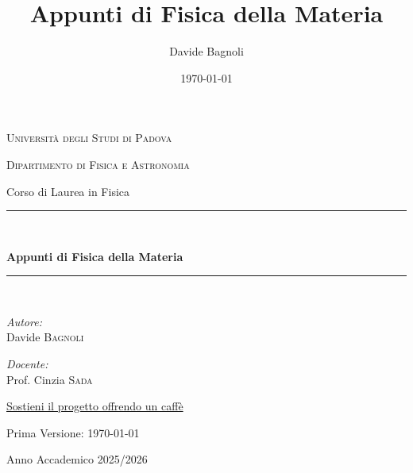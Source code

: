 \documentclass[12pt,a4paper,parskip=half,DIV=14,oneside,chapterprefix=true]{scrreprt}
\title{Appunti di Fisica della Materia}
\author{Davide Bagnoli}
\date{\today}
\begin{document}

\begin{titlepage}
    \centering
    {\scshape\LARGE Università degli Studi di Padova \par}
    \vspace{0.5cm}
    {\scshape\Large Dipartimento di Fisica e Astronomia \par}
    \vspace{0.5cm}
    {\large Corso di Laurea in Fisica \par}
    
    \vspace{1.5cm}

    \rule{\linewidth}{0.5mm} \\[0.4cm] %
    {\huge\bfseries Appunti di Fisica della Materia \par}
    \vspace{0.4cm}
    \rule{\linewidth}{0.5mm} \\[1.5cm] %
    
    \begin{minipage}[t]{0.4\textwidth}
        \begin{flushleft} \large
            \emph{Autore:}\\
            Davide \textsc{Bagnoli}
        \end{flushleft}
    \end{minipage}
    \hfill
    \begin{minipage}[t]{0.4\textwidth}
        \begin{flushright} \large
            \emph{Docente:}\\
            Prof. Cinzia \textsc{Sada}
        \end{flushright}
    \end{minipage}

    \vfill %

    {\small \href{https://paypal.me/DavideBagnoli04}{Sostieni il progetto offrendo un caffè}}
    \vspace{0.5cm}

    {\small Prima Versione: \today \par} 
    \vspace{0.5cm}

    {\Large Anno Accademico 2025/2026}
    
\end{titlepage}
\end{document}
